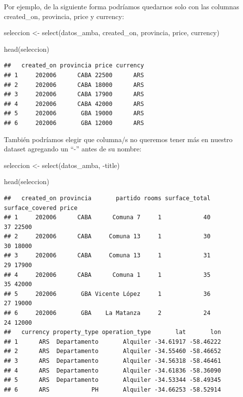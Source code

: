 \documentclass[
  spanish,
]{book}
\newenvironment{Shaded}{\begin{snugshade}}{\end{snugshade}}
\newcommand{\FunctionTok}[1]{\textcolor[rgb]{0.00,0.00,0.00}{#1}}
\newcommand{\NormalTok}[1]{#1}
\newcommand{\OtherTok}[1]{\textcolor[rgb]{0.56,0.35,0.01}{#1}}
\newcommand{\SpecialCharTok}[1]{\textcolor[rgb]{0.00,0.00,0.00}{#1}}
\begin{document}
Por ejemplo, de la siguiente forma podríamos quedarnos solo con las columnas created\_on, provincia, price y currency:

\begin{Shaded}
\begin{Highlighting}[]
\NormalTok{seleccion }\OtherTok{\textless{}{-}} \FunctionTok{select}\NormalTok{(datos\_amba, created\_on, provincia, price, currency)}

\FunctionTok{head}\NormalTok{(seleccion)}
\end{Highlighting}
\end{Shaded}

\begin{verbatim}
##   created_on provincia price currency
## 1     202006      CABA 22500      ARS
## 2     202006      CABA 18000      ARS
## 3     202006      CABA 17900      ARS
## 4     202006      CABA 42000      ARS
## 5     202006       GBA 19000      ARS
## 6     202006       GBA 12000      ARS
\end{verbatim}

También podríamos elegir que columna/s no queremos tener más en nuestro dataset agregando un ``-'' antes de su nombre:

\begin{Shaded}
\begin{Highlighting}[]
\NormalTok{seleccion }\OtherTok{\textless{}{-}} \FunctionTok{select}\NormalTok{(datos\_amba, }\SpecialCharTok{{-}}\NormalTok{title)}

\FunctionTok{head}\NormalTok{(seleccion)}
\end{Highlighting}
\end{Shaded}

\begin{verbatim}
##   created_on provincia       partido rooms surface_total surface_covered price
## 1     202006      CABA      Comuna 7     1            40              37 22500
## 2     202006      CABA     Comuna 13     1            30              30 18000
## 3     202006      CABA     Comuna 13     1            31              29 17900
## 4     202006      CABA      Comuna 1     1            35              35 42000
## 5     202006       GBA Vicente López     1            36              27 19000
## 6     202006       GBA    La Matanza     2            24              24 12000
##   currency property_type operation_type       lat       lon
## 1      ARS  Departamento       Alquiler -34.61917 -58.46222
## 2      ARS  Departamento       Alquiler -34.55460 -58.46652
## 3      ARS  Departamento       Alquiler -34.56318 -58.46461
## 4      ARS  Departamento       Alquiler -34.61836 -58.36090
## 5      ARS  Departamento       Alquiler -34.53344 -58.49345
## 6      ARS            PH       Alquiler -34.66253 -58.52914
\end{verbatim}
\end{document}
